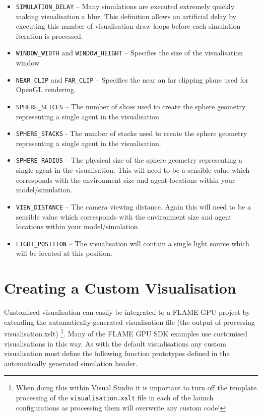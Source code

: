 \documentclass[11pt, a4paper, onecolumn, oneside]{report}
\begin{document}
\begin{itemize}
    \item \texttt{SIMULATION_DELAY} -- Many simulations are executed extremely quickly making visualisation a blur.
        This definition allows an artificial delay by executing this number of visualisation draw loops before each simulation iteration is processed.
    \item \texttt{WINDOW_WIDTH} and \texttt{WINDOW_HEIGHT} -- Specifies the size of the visualisation window 
    \item \texttt{NEAR_CLIP} and \texttt{FAR_CLIP} -- Specifies the near an far clipping plane used for OpenGL rendering.
    \item \texttt{SPHERE_SLICES} -- The number of slices used to create the sphere geometry representing a single agent in the visualisation.
    \item \texttt{SPHERE_STACKS} - The number of stacks used to create the sphere geometry representing a single agent in the visualisation.
    \item \texttt{SPHERE_RADIUS} -- The physical size of the sphere geometry representing a single agent in the visualisation.
        This will need to be a sensible value which corresponds with the environment size and agent locations within your model/simulation.
    \item \texttt{VIEW_DISTANCE} -- The camera viewing distance.
        Again this will need to be a sensible value which corresponds with the environment size and agent locations within your model/simulation.
    \item \texttt{LIGHT_POSITION} -- The visualisation will contain a single light source which will be located at this position.
\end{itemize}


\section{Creating a Custom Visualisation}
\label{sec:46}


Customised visualisation can easily be integrated to a FLAME GPU project by extending the automatically generated visualisation file (the output of processing visualisation.xslt)
\footnote{When doing this within Visual Studio it is important to turn off the template processing of the \texttt{visualisation.xslt} file in each of the launch configurations as processing them will overwrite any custom code!}.
Many of the FLAME GPU SDK examples use customised visualisations in this way.
As with the default visualisations any custom visualisation must define the following function prototypes defined in the automatically generated simulation header.
\end{document}
